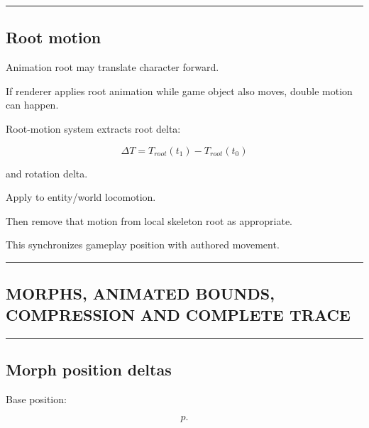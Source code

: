 \begin{center}\rule{0.5\linewidth}{0.5pt}\end{center}

\subsection{Root motion}\label{04-visual-computing-ii-ch041-root-motion}

\hypertarget{04-visual-computing-ii-ch041-root-motion}{}

Animation root may translate character forward.

If renderer applies root animation while game object also moves, double motion can happen.

Root-motion system extracts root delta:

\[
\Delta T=
T_{root}(t_1)
-
T_{root}(t_0)
\]

and rotation delta.

Apply to entity/world locomotion.

Then remove that motion from local skeleton root as appropriate.

This synchronizes gameplay position with authored movement.

\begin{center}\rule{0.5\linewidth}{0.5pt}\end{center}

\subsection{MORPHS, ANIMATED BOUNDS, COMPRESSION AND COMPLETE TRACE}\label{04-visual-computing-ii-ch041-morphs-animated-bounds-compression-and-complete-trace}

\hypertarget{04-visual-computing-ii-ch041-morphs-animated-bounds-compression-and-complete-trace}{}

\begin{center}\rule{0.5\linewidth}{0.5pt}\end{center}

\subsection{Morph position deltas}\label{04-visual-computing-ii-ch041-morph-position-deltas}

\hypertarget{04-visual-computing-ii-ch041-morph-position-deltas}{}

Base position:

\[
p.
\]

